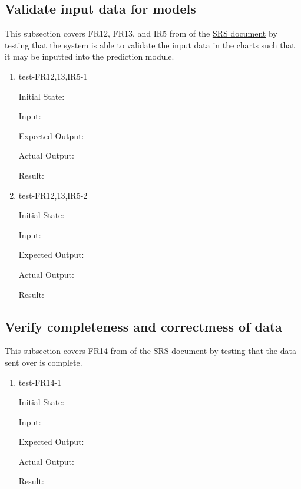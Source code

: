 \documentclass[12pt, titlepage]{article}
\begin{document}
\subsection{Validate input data for models} \label{section:3.7}

This subsection covers FR12, FR13, and IR5 from of the \href{https://github.com/Inreet-Kaur/capstone/blob/main/docs/SRS/SRS.pdf} {SRS document} by testing that the system is able to validate the input data in the charts such that it may be inputted into the prediction module.

\begin{enumerate}

  \item{test-FR12,13,IR5-1} \label{test-FR12,13,IR5-1}
  
  Initial State:

  Input:

  Expected Output:

  Actual Output:

  Result:

  \item{test-FR12,13,IR5-2} \label{test-FR12,13,IR5-2}
  
  Initial State:

  Input:

  Expected Output:

  Actual Output:

  Result:

\end{enumerate}

\subsection{Verify completeness and correctmess of data} \label{section:3.8}

This subsection covers FR14 from of the \href{https://github.com/Inreet-Kaur/capstone/blob/main/docs/SRS/SRS.pdf} {SRS document} by testing that the data sent over is complete.

\begin{enumerate}

  \item{test-FR14-1} \label{test-FR14-1}
  
  Initial State:

  Input:

  Expected Output:

  Actual Output:

  Result:

\end{enumerate}
\end{document}
